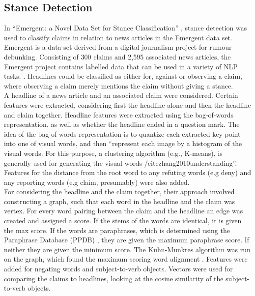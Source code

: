 \documentclass[11pt,a4paper]{article}
\begin{document}
\subsection{Stance Detection} 

In “Emergent: a Novel Data Set for Stance Classification” \cite{ferreira2016emergent}, stance detection was used to classify claims in relation to news articles in the Emergent data set. Emergent is a data-set derived from a digital journalism project for rumour debunking. Consisting of 300 claims and 2,595 associated news articles, the Emergent project contains labelled data that can be used in a variety of NLP tasks. \cite{ferreira2016emergent}. Headlines could be classified as either for, against or observing a claim, where observing a claim merely mentions the claim without giving a stance. \\

A headline of a news article and an associated claim were considered. Certain features were extracted, considering first the headline alone and then the headline and claim together. Headline features were extracted using the bag-of-words representation, as well as whether the headline ended in a question mark. The idea of the bag-of-words representation is to quantize each extracted key point into one of visual words, and then “represent each image by a histogram of the visual words. For this purpose, a clustering algorithm (e.g., K-means), is generally used for generating the visual words /cite{zhang2010understanding}”. Features for the distance from the root word to any refuting words (e.g deny) and any reporting words (e.g claim, presumably) were also added. \\

For considering the headline and the claim together, their approach involved constructing a graph, such that each word in the headline and the claim was vertex.  For every word pairing between the claim and the headline an edge was created and assigned a score. If the stems of the words are identical, it is given the max score. If the words are paraphrases, which is determined using the Paraphrase Database (PPDB) \cite{ferreira2016emergent}, they are given the maximum paraphrase score. If neither they are given the minimum score. The Kuhn-Munkres algorithm was run on the graph, which found the maximum scoring word alignment \cite{ferreira2016emergent}. Features were added for negating words and subject-to-verb objects. Vectors were used for comparing the claims to headlines, looking at the cosine similarity of the subject-to-verb objects. \\
\end{document}
